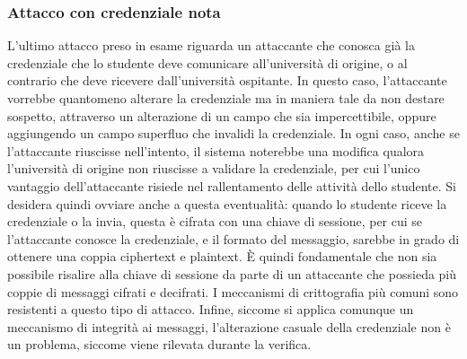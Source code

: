 \documentclass[a4paper,12pt]{article}
\begin{document}
\subsubsection{Attacco con credenziale nota}
L'ultimo attacco preso in esame riguarda un attaccante che conosca già la credenziale che lo studente deve comunicare all'università di origine, o al contrario che deve ricevere dall'università ospitante. In questo caso, l'attaccante vorrebbe quantomeno alterare la credenziale ma in maniera tale da non destare sospetto, attraverso un alterazione di un campo che sia impercettibile, oppure aggiungendo un campo superfluo che invalidi la credenziale.
\newline In ogni caso, anche se l'attaccante riuscisse nell'intento, il sistema noterebbe una modifica qualora l'università di origine non riuscisse a validare la credenziale, per cui l'unico vantaggio dell'attaccante risiede nel rallentamento delle attività dello studente.
\newline Si desidera quindi ovviare anche a questa eventualità: quando lo studente riceve la credenziale o la invia, questa è cifrata con una chiave di sessione, per cui se l'attaccante conosce la credenziale, e il formato del messaggio, sarebbe in grado di ottenere una coppia ciphertext e plaintext. È quindi fondamentale che non sia possibile risalire alla chiave di sessione da parte di un attaccante che possieda più coppie di messaggi cifrati e decifrati. I meccanismi di crittografia più comuni sono resistenti a questo tipo di attacco.
\newline Infine, siccome si applica comunque un meccanismo di integrità ai messaggi, l'alterazione casuale della credenziale non è un problema, siccome viene rilevata durante la verifica.
\end{document}
